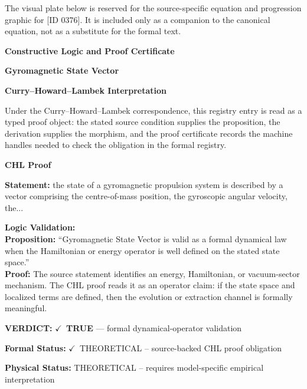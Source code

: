\begingroup\footnotesize\sloppy
The visual plate below is reserved for the source-specific equation and progression graphic for [ID 0376]. It is included only as a companion to the canonical equation, not as a substitute for the formal text.
\par\endgroup
\ifTZPDarkEdition
{}
\fi

\clearpage
\begingroup\tzpsupportsetup
\noindent\textbf{\fontsize{10.8pt}{12.8pt}\selectfont [ID 0376] Constructive Logic and Proof Certificate}\par
\noindent\textbf{\fontsize{10pt}{12pt}\selectfont Gyromagnetic State Vector}\par
\vspace{0.45em}
\begingroup
\footnotesize
\setlength{\parskip}{0.22em}
\setlength{\parindent}{0pt}
\noindent\textbf{Curry--Howard--Lambek Interpretation}\par
Under the Curry--Howard--Lambek correspondence, this registry entry is read as a typed proof
object: the stated source condition supplies the proposition, the derivation supplies the
morphism, and the proof certificate records the machine handles needed to check the obligation
in the formal registry.

\vspace{0.45em}
\noindent\textbf{CHL Proof}\par
\textbf{Statement:} the state of a gyromagnetic propulsion system is described by a vector comprising the
centre-of-mass position, the gyroscopic angular velocity, the...

\textbf{Logic Validation:}\\
\textbf{Proposition:} ``Gyromagnetic State Vector is valid as a formal dynamical law when the Hamiltonian or
energy operator is well defined on the stated state space.''\\
\textbf{Proof:} The source statement identifies an energy, Hamiltonian, or vacuum-sector mechanism. The
CHL proof reads it as an operator claim: if the state space and localized terms are
defined, then the evolution or extraction channel is formally meaningful.

\textbf{VERDICT:} \ensuremath{\checkmark}\ \textbf{TRUE} --- formal dynamical-operator validation

\textbf{Formal Status:} \ensuremath{\checkmark}\ THEORETICAL -- source-backed CHL proof obligation

\textbf{Physical Status:} THEORETICAL -- requires model-specific empirical interpretation
\par\vspace{0.45em}
\par
\ifTZPDarkEdition
{}
\fi
\endgroup
\endgroup
